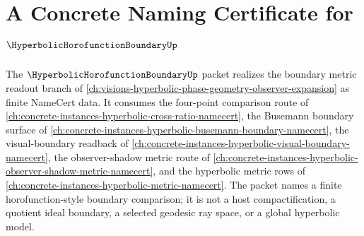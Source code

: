 \chapter{A Concrete Naming Certificate for $\HyperbolicHorofunctionBoundaryUp$}
\label{ch:concrete-instances-hyperbolic-horofunction-boundary-namecert}

The $\HyperbolicHorofunctionBoundaryUp$ packet realizes the boundary metric readout branch of \autoref{ch:visions-hyperbolic-phase-geometry-observer-expansion} as finite NameCert data. It consumes the four-point comparison route of \autoref{ch:concrete-instances-hyperbolic-cross-ratio-namecert}, the Busemann boundary surface of \autoref{ch:concrete-instances-hyperbolic-busemann-boundary-namecert}, the visual-boundary readback of \autoref{ch:concrete-instances-hyperbolic-visual-boundary-namecert}, the observer-shadow metric route of \autoref{ch:concrete-instances-hyperbolic-observer-shadow-metric-namecert}, and the hyperbolic metric rows of \autoref{ch:concrete-instances-hyperbolic-metric-namecert}. The packet names a finite horofunction-style boundary comparison; it is not a host compactification, a quotient ideal boundary, a selected geodesic ray space, or a global hyperbolic model.

